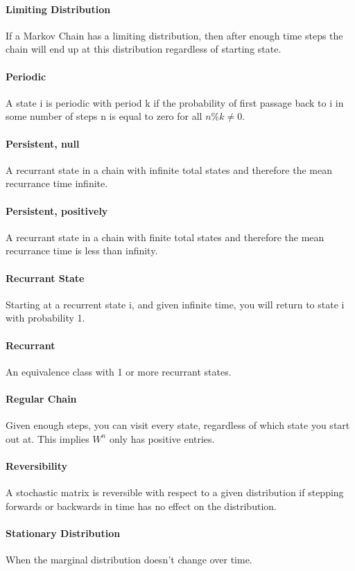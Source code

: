 \documentclass[12pt]{article}
\begin{document}
    \paragraph{Limiting Distribution} If a Markov Chain has a limiting distribution, then after enough time steps the chain will end up at this distribution regardless of starting state.
    \paragraph{Periodic} A state i is periodic with period k if the probability of first passage back to i in some number of steps n is equal to zero for all \(n \% k \ne 0\).
    \paragraph{Persistent, null} A recurrant state in a chain with infinite total states and therefore the mean recurrance time infinite.
    \paragraph{Persistent, positively} A recurrant state in a chain with finite total states and therefore the mean recurrance time is less than infinity.
    \paragraph{Recurrant State} Starting at a recurrent state i, and given infinite time, you will return to state i with probability 1.
    \paragraph{Recurrant} An equivalence class with 1 or more recurrant states.
    \paragraph{Regular Chain} Given enough steps, you can visit every state, regardless of which state you start out at. This implies \(W^n\) only has positive entries.
    \paragraph{Reversibility} A stochastic matrix is reversible with respect to a given distribution if stepping forwards or backwards in time has no effect on the distribution.
    \paragraph{Stationary Distribution} When the marginal distribution doesn't change over time.
\end{document}
